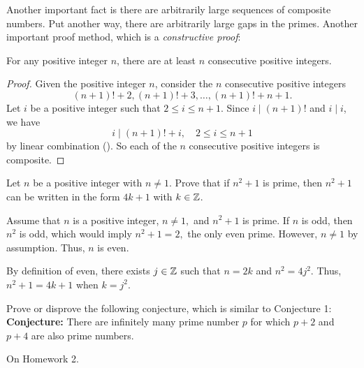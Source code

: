 \documentclass{../ximera}
\begin{document}
Another important fact is there are arbitrarily large sequences of composite numbers. Put another way, there are arbitrarily large gaps in the primes. Another important proof method, which is a \emph{constructive proof}:

\begin{prop*}[Proposition 1.8]\label{prop:gaps-primes}
 For any positive integer $n$, there are at least $n$ consecutive positive integers.
\end{prop*}
\begin{proof}
 Given the positive integer $n$, consider the $n$ consecutive positive integers \[(n+1)!+2, (n+1)!+3,\dots, (n+1)!+n+1.\]
 Let $i$ be a positive integer such that $2\leq i\leq n+1$. Since $i\mid (n+1)!$ and $i\mid i$, we have \[i\mid(n+1)! +i,\quad 2\leq i\leq n+1\] by linear combination (). So each of the $n$ consecutive positive integers is composite.
\end{proof}

  \begin{br} Let $n$ be a positive integer with $n\neq 1$. Prove that if $n^2+1$ is prime, then $n^2+1$ can be written in the form $4k+1$ with $k\in\mathbb Z$.
  \begin{solution}
   Assume that $n$ is a positive integer, $n\neq 1,$ and $n^2+1$ is prime. If $n$ is odd, then $n^2$ is odd, which would imply $n^2+1=2,$ the only even prime. However, $n\neq 1$ by assumption. Thus, $n$ is even. 

    By definition of even, there exists $j\in\mathbb Z$ such that $n=2k$ and $n^2=4j^2$. Thus, $n^2+1=4k+1$ when $k=j^2.$
  \end{solution}
\end{br}

  \begin{br}
  Prove or disprove the following conjecture, which is similar to Conjecture 1:\\
      \textbf{Conjecture:} There are infinitely many prime number $p$ for which $p+2$ and $p+4$ are also prime numbers.

  
  \begin{solution}
    On Homework 2.
  \end{solution}
    \end{br}



\end{document}

